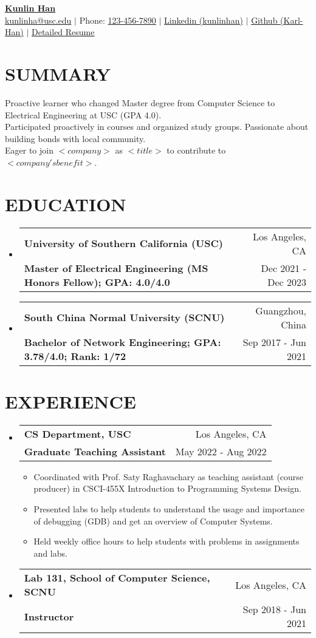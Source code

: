 \documentclass[letterpaper,11pt]{article}
\makeatletter
\newcommand{\resumeItemOne}[1]{
  \item\small{#1}
}
\newcommand{\resumeSubheading}[4]{
  \vspace{-1pt}\item
    \begin{tabular*}{0.97\textwidth}[t]{l@{\extracolsep{\fill}}r}
      \textbf{#1} & #2 \\
      \textbf{\small#3} & \small{#4} \\
    \end{tabular*}\vspace{-10pt}
}
\newcommand{\resumeSubHeadingListStart}{\begin{itemize}[leftmargin=*]}
\newcommand{\resumeSubHeadingListEnd}{\end{itemize}\vspace{-5pt}}
\newcommand{\resumeItemListStart}{\begin{itemize}}
\newcommand{\resumeItemListEnd}{\end{itemize}\vspace{-10pt}}
\makeatother
\begin{document}
\textbf{\href{https://www.linkedin.com/in/kunlinhan/}{\LARGE {Kunlin Han}}} \\
{
    \href{mailto:{kunlinha@usc.edu}}{{kunlinha@usc.edu}} $|$ Phone: \href{tel:{}}{123-456-7890} $|$ \href{https://www.linkedin.com/in/kunlinhan/}{Linkedin (kunlinhan)}  $|$ \href{https://github.com/Karl-Han}{Github (Karl-Han)}  $|$ \href{https://www.iwktd.com/}{Detailed Resume} 
}\section{SUMMARY}
Proactive learner who changed Master degree from Computer Science to Electrical Engineering at USC (GPA 4.0).\\ 
Participated proactively in courses and organized study groups. Passionate about building bonds with local community.\\ 
Eager to join $<company>$ as $<title>$ to contribute to $<company's benefit>$.\\ 


\section{EDUCATION}
\resumeSubHeadingListStart
\resumeSubheading
    {University of Southern California (USC)}{Los Angeles, CA}
    {Master of Electrical Engineering (MS Honors Fellow); GPA: 4.0/4.0
}{Dec 2021 - Dec 2023}
\resumeSubheading
    {South China Normal University (SCNU)}{Guangzhou, China}
    {Bachelor of Network Engineering; GPA: 3.78/4.0; Rank: 1/72
}{Sep 2017 - Jun 2021}
\resumeSubHeadingListEnd



\section{EXPERIENCE}
\resumeSubHeadingListStart
\resumeSubheading
    {CS Department, USC}{Los Angeles, CA}
    {Graduate Teaching Assistant}{May 2022 - Aug 2022}
\resumeItemListStart
	\resumeItemOne{Coordinated with Prof. Saty Raghavachary as teaching assistant (course producer) in CSCI-455X Introduction to Programming Systems Design.}
	\resumeItemOne{Presented labs to help students to understand the usage and importance of debugging (GDB) and get an overview of Computer Systems.}
	\resumeItemOne{Held weekly office hours to help students with problems in assignments and labs.}
\resumeItemListEnd
\resumeSubheading
    {Lab 131, School of Computer Science, SCNU}{Los Angeles, CA}
    {Instructor}{Sep 2018 - Jun 2021}
\resumeSubHeadingListEnd
\end{document}
